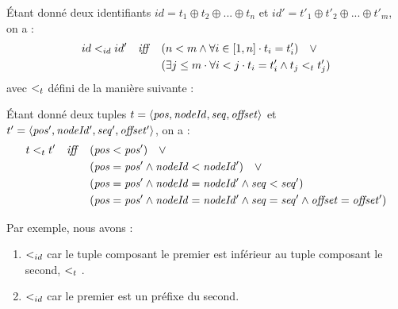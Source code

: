 \begin{definition}
  Étant donné deux identifiants $id = t_1 \oplus t_2 \oplus ... \oplus t_n$ et $id' = t'_1 \oplus t'_2 \oplus ... \oplus t'_m$, on a :
  \begin{equation*}
    \begin{split}
      id <_{id} id' \quad \mathit{iff} \quad     & (n < m \land \forall i \in [1,n] \cdot t_i = t'_i) \quad \lor \\
                                            & (\exists j \leq m \cdot \forall i < j \cdot t_i = t'_i \land t_j <_{t} t'_j) \\
    \end{split}
  \end{equation*}
  avec $<_{t}$ défini de la manière suivante :
  \begin{subdefinition}
    Étant donné deux tuples $t = \langle \mathit{pos},\mathit{nodeId},\mathit{seq},\mathit{offset} \rangle$ et $t' = \langle \mathit{pos'},\mathit{nodeId'},\mathit{seq'},\mathit{offset'} \rangle$, on a :
    \begin{equation*}
      \begin{split}
        t <_{t} t' \quad \mathit{iff} \quad  & (\mathit{pos} < \mathit{pos}') \quad \lor \\
                                            & (\mathit{pos} = \mathit{pos'} \land \mathit{nodeId} < \mathit{nodeId'}) \quad \lor \\
                                            & (\mathit{pos} = \mathit{pos'} \land \mathit{nodeId} = \mathit{nodeId'} \land \mathit{seq} < \mathit{seq'}) \\
                                            & (\mathit{pos} = \mathit{pos'} \land \mathit{nodeId} = \mathit{nodeId'} \land \mathit{seq} = \mathit{seq'} \land \mathit{offset} = \mathit{offset'}) \\
      \end{split}
    \end{equation*}
  \end{subdefinition}
\end{definition}

Par exemple, nous avons :
\begin{enumerate}
  \item  {} $<_{id}$  car le tuple composant le premier est inférieur au tuple composant le second, \ie {} $<_{t}$ .
  \item {} $<_{id}$  car le premier est un préfixe du second.
\end{enumerate}
